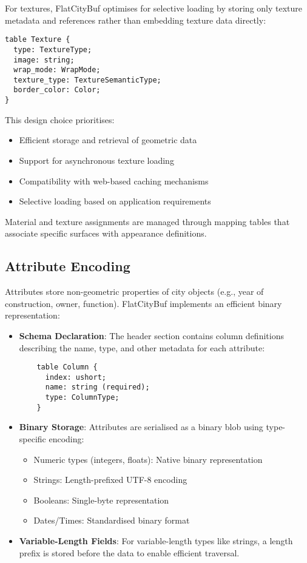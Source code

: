 For textures, FlatCityBuf optimises for selective loading by storing only texture metadata and references rather than embedding texture data directly:

\begin{verbatim}
table Texture {
  type: TextureType;
  image: string;
  wrap_mode: WrapMode;
  texture_type: TextureSemanticType;
  border_color: Color;
}
\end{verbatim}

This design choice prioritises:
\begin{itemize}
    \item Efficient storage and retrieval of geometric data
    \item Support for asynchronous texture loading
    \item Compatibility with web-based caching mechanisms
    \item Selective loading based on application requirements
\end{itemize}

Material and texture assignments are managed through mapping tables that associate specific surfaces with appearance definitions.

\subsection{Attribute Encoding}
\label{methodology:feature_encoding:attribute_encoding}


Attributes store non-geometric properties of city objects (e.g., year of construction, owner, function). FlatCityBuf implements an efficient binary representation:

\begin{itemize}
    \item \textbf{Schema Declaration}: The header section contains column definitions describing the name, type, and other metadata for each attribute:

    \begin{verbatim}
    table Column {
      index: ushort;
      name: string (required);
      type: ColumnType;
    }
    \end{verbatim}

    \item \textbf{Binary Storage}: Attributes are serialised as a binary blob using type-specific encoding:
    \begin{itemize}
        \item Numeric types (integers, floats): Native binary representation
        \item Strings: Length-prefixed UTF-8 encoding
        \item Booleans: Single-byte representation
        \item Dates/Times: Standardised binary format
    \end{itemize}

    \item \textbf{Variable-Length Fields}: For variable-length types like strings, a length prefix is stored before the data to enable efficient traversal.
\end{itemize}

